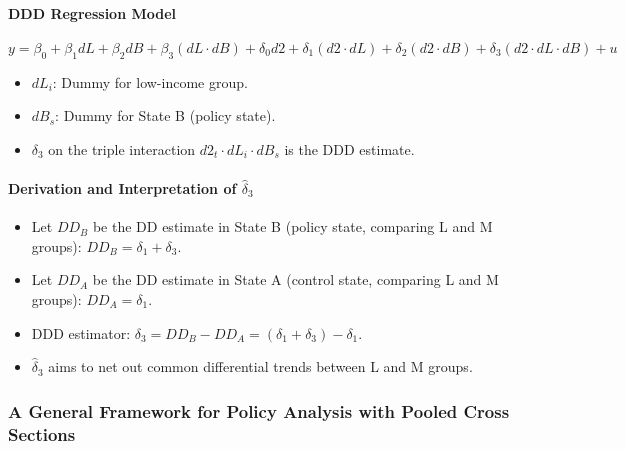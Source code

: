 \documentclass[a4paper, 10pt]{article}
\theoremstyle{definition}	%
\begin{document}
\paragraph{DDD Regression Model} %
\[ y = \beta_0 + \beta_1 dL + \beta_2 dB + \beta_3 (dL \cdot dB) + \delta_0 d2 + \delta_1 (d2 \cdot dL) + \delta_2 (d2 \cdot dB) + \delta_3 (d2 \cdot dL \cdot dB) + u \]
\begin{itemize}
    \item \(dL_i\): Dummy for low-income group.
    \item \(dB_s\): Dummy for State B (policy state).
    \item \(\delta_3\) on the triple interaction \(d2_t \cdot dL_i \cdot dB_s\) is the DDD estimate.
\end{itemize}

\paragraph{Derivation and Interpretation of \(\hat{\delta}_3\)} %
\begin{itemize}
    \item Let \(DD_B\) be the DD estimate in State B (policy state, comparing L and M groups): \(DD_B = \delta_1 + \delta_3\).
    \item Let \(DD_A\) be the DD estimate in State A (control state, comparing L and M groups): \(DD_A = \delta_1\).
    \item DDD estimator: \(\delta_3 = DD_B - DD_A = (\delta_1 + \delta_3) - \delta_1\).
    \item \(\hat{\delta}_3\) aims to net out common differential trends between L and M groups.
\end{itemize}

\subsubsection{A General Framework for Policy Analysis with Pooled Cross Sections} %
\end{document}
